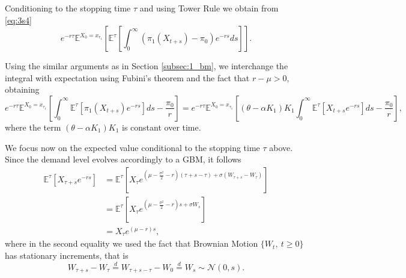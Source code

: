 Conditioning to the stopping time $\tau$ and using Tower Rule we obtain from \eqref{eq:3s4}
\begin{equation}
e^{-r\tau} \mathds{E}^{X_0=x_{\tau_1}} \left[ \mathds{E}^{\tau}  \left[ \int_{0}^\infty \left( \pi_1(X_{t+s})-\pi_0 \right) e^{-rs}ds  \right] \right].
\label{eq:3s5}
\end{equation}

Using the similar arguments as in Section \ref{subsec:1_bm}, we interchange the integral with expectation using Fubini's theorem and the fact that $r-\mu>0$, obtaining
\begin{equation}
e^{-r\tau} \mathds{E}^{X_0=x_{\tau_1}} \left[  \int_{0}^\infty \mathds{E}^{\tau}  \left[ \pi_1(X_{t+s}) e^{-rs}  \right] ds - \frac{\pi_0}{r} \right]=  e^{-r\tau} \mathds{E}^{X_0=x_{\tau_1}} \left[    (\theta-\alpha K_1)K_1  \int_{0}^\infty \mathds{E}^{\tau}  \left[  X_{t+s} e^{-rs}  \right] ds - \frac{\pi_0}{r} \right],
\label{eq:3s6}
\end{equation}
where the term $ (\theta-\alpha K_1)K_1$ is constant over time.



We focus now on the expected value conditional to the stopping time $\tau$ above. 
Since the demand level evolves accordingly to a GBM, it follows 
\begin{align}
\mathds{E}^{\tau}  \left[  X_{\tau+s}e^{-rs}  \right] 
&=\mathds{E}^{\tau}  \left[  X_{\tau} e^{\left( \mu- \frac{\sigma^2}{2}-r \right)   (\tau+s-\tau)+\sigma( W_{\tau+s}-W_\tau)}  \right]  \nonumber \\
&=\mathds{E}^{\tau}  \left[  X_{\tau} e^{\left( \mu- \frac{\sigma^2}{2}-r \right) s+\sigma W_{s}}   \right]  \nonumber \\
&= X_{\tau} e^{\left( \mu-r \right)s},
\label{eq:3s8}
\end{align}
where in the second equality we used the fact that Brownian Motion $\{ W_t, \ t \geq0 \}$ has stationary increments, that is 
$$W_{\tau+s}-W_\tau \overset{d}{=} W_{\tau+s-\tau}-W_0 \overset{d}{=} W_{s} \sim \mathcal{N}(0,s).$$




